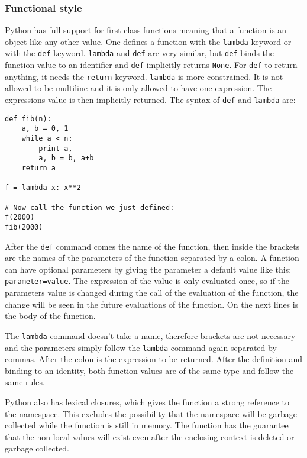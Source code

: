 \subsubsection{Functional style}

Python has full support for first-class functions meaning that a function is an
object like any other value. One defines a function with the \texttt{lambda}
keyword or with the \texttt{def} keyword. \texttt{lambda} and \texttt{def} are
very similar, but \texttt{def} binds the function value to an identifier and
\texttt{def} implicitly returns \texttt{None}. For \texttt{def} to return
anything, it needs the \texttt{return} keyword. \texttt{lambda} is more
constrained. It is not allowed to be multiline and it is only allowed to have
one expression. The expressions value is then implicitly returned. The syntax of
\verb;def; and \verb;lambda; are:
\begin{verbatim}
def fib(n):
    a, b = 0, 1
    while a < n:
        print a,
        a, b = b, a+b
    return a

f = lambda x: x**2

# Now call the function we just defined:
f(2000)
fib(2000)
\end{verbatim}
After the \verb;def; command comes the name of the function, then inside the
brackets are the names of the parameters of the function separated by a colon.
A function can have optional parameters by giving the parameter a default value
like this: \verb;parameter=value;. The expression of the value is only
evaluated once, so if the parameters value is changed during the call of the
evaluation of the function, the change will be seen in the future evaluations
of the function. On the next lines is the body of the function.

The \verb;lambda; command doesn't take a name, therefore brackets are not
necessary and the parameters simply follow the \verb;lambda; command again
separated by commas. After the colon is the expression to be returned. After
the definition and binding to an identity, both function values are of the same
type and follow the same rules.

Python also has lexical closures, which gives the function a strong reference to
the namespace. This excludes the possibility that the namespace will be garbage
collected while the function is still in memory. The function has the guarantee
that the non-local values will exist even after the enclosing context is deleted
or garbage collected.\cite{website:python-closures}

